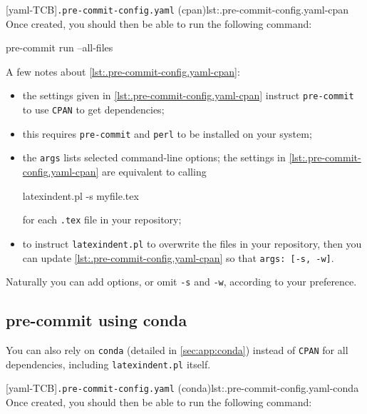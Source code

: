   [yaml-TCB]{\texttt{.pre-commit-config.yaml} (cpan)}{lst:.pre-commit-config.yaml-cpan}
  Once created, you should then be able to run the following command:

  \begin{commandshell}
pre-commit run --all-files  
\end{commandshell}

  A few notes about \cref{lst:.pre-commit-config.yaml-cpan}:
  \begin{itemize}
   \item the settings given in \cref{lst:.pre-commit-config.yaml-cpan} instruct
         \texttt{pre-commit} to use \texttt{CPAN} to get dependencies;
   \item this requires \texttt{pre-commit} and \texttt{perl} to be installed on your
         system;
   \item the \texttt{args} lists selected command-line options; the settings in
         \cref{lst:.pre-commit-config.yaml-cpan} are equivalent to calling

         \begin{commandshell}
latexindent.pl -s myfile.tex       
\end{commandshell}

         for each \texttt{.tex} file in your repository;
   \item to instruct \texttt{latexindent.pl} to overwrite the files in your repository,
         then you can update \cref{lst:.pre-commit-config.yaml-cpan} so that
         \texttt{args: [-s, -w]}.
  \end{itemize}

  Naturally you can add options, or omit \texttt{-s} and \texttt{-w}, according to your
  preference.

 \subsection{pre-commit using conda}\label{sec:pre-commit-conda}

  You can also rely on \texttt{conda} (detailed in \cref{sec:app:conda}) instead of
  \texttt{CPAN} for all dependencies, including \texttt{latexindent.pl} itself.
    

  [yaml-TCB]{\texttt{.pre-commit-config.yaml} (conda)}{lst:.pre-commit-config.yaml-conda}
  Once created, you should then be able to run the following command:

